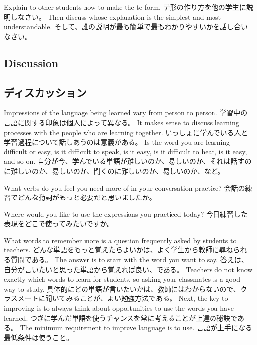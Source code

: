 \documentclass[uplatex,dvipdfmx,b5paper,english,10pt]{jsbook}
\begin{document}
\begin{toiquestion}
\ifEnglish
Explain to other students how to make the te form.
\else
テ形の作り方を他の学生に説明しなさい。
\fi
\ifEnglish
Then discuss whose explanation is the simplest and most understandable.
\else
そして、誰の説明が最も簡単で最もわかりやすいかを話し合いなさい。
\fi
\end{toiquestion}


\ifEnglish
\subsection{Discussion}
\else
\subsection{ディスカッション}
\fi
\ifEnglish
Impressions of the language being learned vary from person to person.
\else
学習中の言語に関する印象は個人によって異なる。
\fi
\ifEnglish
It makes sense to discuss learning processes with the people who are learning together.
\else
いっしょに学んでいる人と学習過程について話しあうのは意義がある。
\fi
\ifEnglish
Is the word you are learning difficult or easy, is it difficult to speak, is it easy, is it difficult to hear, is it easy, and so on.
\else
自分が今、学んでいる単語が難しいのか、易しいのか、それは話すのに難しいのか、易しいのか、聞くのに難しいのか、易しいのか、など。
\fi

\begin{toiquestion}
\ifEnglish
 What verbs do you feel you need more of in your conversation practice?
\else
  会話の練習でどんな動詞がもっと必要だと思いましたか。
\fi
\end{toiquestion}

\begin{toiquestion}
\ifEnglish
 Where would you like to use the expressions you practiced today?
\else
 今日練習した表現をどこで使ってみたいですか。
\fi
\end{toiquestion}

\ifEnglish
What words to remember more is a question frequently asked by students to teachers.
\else
どんな単語をもっと覚えたらよいかは、よく学生から教師に尋ねられる質問である。
\fi
\ifEnglish
The answer is to start with the word you want to say.
\else
答えは、自分が言いたいと思った単語から覚えれば良い、である。
\fi
\ifEnglish
Teachers do not know exactly which words to learn for students, so asking your classmates is a good way to study.
\else
具体的にどの単語が言いたいかは、教師にはわからないので、クラスメートに聞いてみることが、よい勉強方法である。
\fi
\ifEnglish
Next, the key to improving is to always think about opportunities to use the words you have learned.
\else
つぎに学んだ単語を使うチャンスを常に考えることが上達の秘訣である。
\fi
\ifEnglish
The minimum requirement to improve language is to use.
\else
言語が上手になる最低条件は使うこと。
\fi
\end{document}
